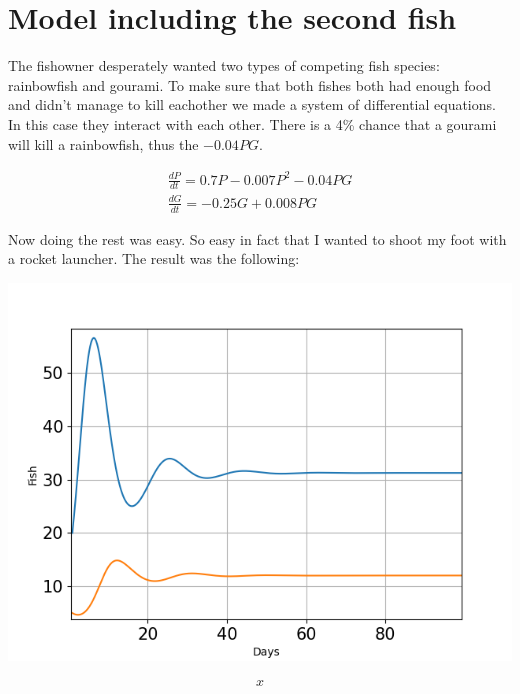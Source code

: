 

\section{Model including the second fish}

\begin{flushleft}
    The fishowner desperately wanted two types of competing fish species:
    rainbowfish and gourami.
    To make sure that both fishes both had enough food and didn't manage to kill eachother
    we made a system of differential equations. In this case they interact with each other.
    There is a 4\% chance that a gourami will kill a rainbowfish, thus the $-0.04PG$.
\end{flushleft}

\begin{align*}[left = \empheqlbrace]
    \frac{dP}{dt}= 0.7P-0.007P^2-0.04PG \\
    \frac{dG}{dt} = -0.25G+0.008PG
\end{align*}

\begin{flushleft}
    Now doing the rest was easy. So easy in fact that I wanted to shoot my foot
    with a rocket launcher. The result was the following:

\end{flushleft}
\begin{center}
    \includegraphics[scale=0.4]{../figures/Figure_2.png}
\end{center}


\begin{equation}
    x
\end{equation}